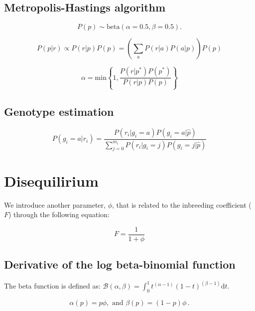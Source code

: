 \documentclass[11pt,english,letterpaper,oneside]{article}
\begin{document}
\subsection{Metropolis-Hastings algorithm}

\begin{equation}
P(p) \sim \text{beta}(\alpha = 0.5, \beta = 0.5).
\end{equation}

\begin{equation}
P(p|r) \propto P(r|p)P(p) = \left(\sum_a P(r|a)P(a|p)\right)P(p)
\end{equation}

\begin{equation}
\alpha = \text{min} \left\{1, \frac{P(r|p^*)P(p^*)}{P(r|p)P(p)} \right\}
\end{equation}

\subsection{Genotype estimation}

\begin{equation}
P(g_i = a|r_i) = \frac{P(r_i|g_i = a)P(g_i = a|\hat{p})}{\sum_{j=0}^{m_i}P(r_i|g_i = j)P(g_i = j|\hat{p})}
\end{equation}

\section{Disequilirium}

We introduce another parameter, $\phi$, that is related to the inbreeding coefficient ($F$) through the following equation:

\begin{equation}
F = \frac{1}{1 + \phi}
\end{equation}

\subsection{Derivative of the log beta-binomial function}

The beta function is defined as: $\mathcal{B}(\alpha,\beta) = \int_0^1 t^{(\alpha-1)}(1-t)^{(\beta-1)}\text{d}t$.



\begin{equation}
\alpha(p) = p\phi, \text{  and  } \beta(p) = (1-p)\phi\,.
\end{equation}
\end{document}
